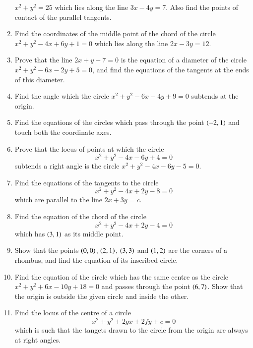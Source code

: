 \begin{enumerate}[label=\arabic*.,ref=\thesubsection.\theenumi]
$x^2+y^2=25$ which lies along the line $3x-4y=7$.  Also find the 
points of contact of the parallel tangents.
\item Find the coordinates of the middle point of the chord of the circle
$x^2+y^2-4x+6y+1=0$ which lies along the line $2x-3y=12$.  
\item Prove that the line $2x+y-7=0$ is the equation of a diameter of the circle
$x^2+y^2-6x-2y+5=0$, and find the equations of the tangents at the ends of this
diameter.
\item Find the angle which the circle $x^2+y^2-6x-4y+9=0$ subtends at
the origin.
\item Find the equations of the circles which pass through the point $\left(-2,1\right)$
and touch both the coordinate axes.
\item Prove that the locus of points at which the circle
\begin{equation}
x^2+y^2-4x-6y+4=0
\end{equation}
subtends a right angle is the circle $x^2+y^2-4x-6y-5=0$.
\item Find the equations of the tangents to the circle
\begin{equation}
x^2+y^2-4x+2y-8=0
\end{equation}
which are parallel to the line $2x+3y=c$.
\item Find the equation of the chord of the circle
\begin{equation}
x^2+y^2-4x+2y-4=0
\end{equation}
which has $\left(3,1\right)$ as its middle point.
\item Show that the points $\left(0,0\right)$, $\left(2,1\right)$, $\left(3,3\right)$
and $\left(1,2\right)$ are the corners of a rhombus, and find the equation
of its inscribed circle.
\item Find the equation of the circle which has the same centre as the circle
$x^2+y^2+6x-10y+18=0$ and passes through the point $\left(6,7\right)$.  Show that
the origin is outside the given circle and inside the other.
\item Find the locus of the centre of a circle
\begin{equation}
x^2+y^2+2gx+2fy+c=0
\end{equation}
which is such that the tangets drawn to the circle from the origin are always at right angles.
\end{enumerate}
